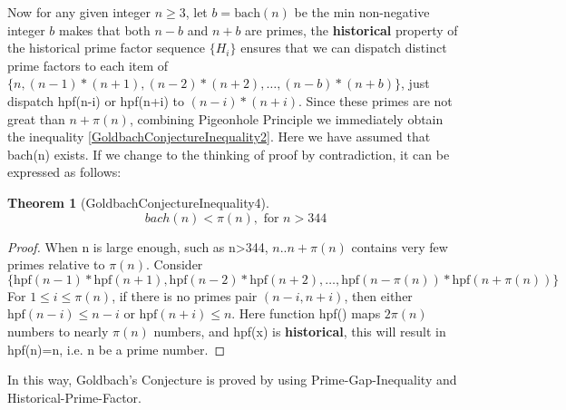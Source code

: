 \documentclass[12pt,a4paper,reqno]{amsart}
\numberwithin{equation}{section}
\theoremstyle{plain}
\newtheorem{theorem}{Theorem}[section]
\theoremstyle{definition}
\begin{document}
	
	Now for any given integer $n \geq 3$, let $b=\text{bach}(n)$ be the min non-negative integer 
	$b$ makes that both $n-b$ and $n+b$ are primes, the \textbf{historical} property 
	of the historical prime factor sequence $\{H_i\}$ ensures that we can dispatch 
	distinct prime factors to each item of  
	$\{n,(n-1)*(n+1),(n-2)*(n+2),\dots,(n-b)*(n+b)\}$, just dispatch hpf(n-i) or hpf(n+i) 
	to $(n-i)*(n+i)$. Since these primes are not great than $n+\pi(n)$, combining 
	Pigeonhole Principle we immediately obtain the inequality \eqref{GoldbachConjectureInequality2}. 
	Here we have assumed that bach(n) exists. If we change to the thinking of 
	proof by contradiction, it can be expressed as follows: 
	\begin{theorem}[GoldbachConjectureInequality4]
		\begin{equation}
			bach(n) < \pi(n), \text{ for } n>344
		\end{equation}
	\end{theorem}
	\begin{proof}
		When n is large enough, such as n>344, $n..n+\pi(n)$ contains very few primes 
		relative to $\pi(n)$. Consider 
		\[ \big\{\text{hpf}(n-1)*\text{hpf}(n+1),\text{hpf}(n-2)*\text{hpf}(n+2), \ldots ,\text{hpf}(n-\pi(n))*\text{hpf}(n+\pi(n))\big\} \]
		For $1 \leq i \leq \pi(n)$, if there is no primes pair $(n-i,n+i)$,  
		then either $\text{hpf}(n-i) \le n-i$ or $\text{hpf}(n+i) \le n$. 
		Here function hpf() maps $2\pi(n)$ numbers to nearly $\pi(n)$ numbers, 
		and hpf(x) is \textbf{historical}, this will result in hpf(n)=n, 
		i.e. n be a prime number. 
	\end{proof}
	In this way, Goldbach's Conjecture is proved by using Prime-Gap-Inequality and Historical-Prime-Factor. 
\end{document}
